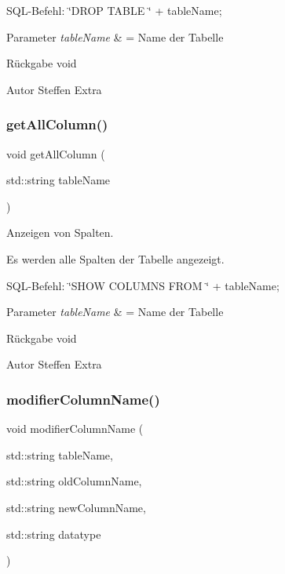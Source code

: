 S\+Q\+L-\/\+Befehl\+: \char`\"{}\+D\+R\+O\+P T\+A\+B\+L\+E \char`\"{} + table\+Name;


\begin{DoxyParams}{Parameter}
{\em table\+Name} & = Name der Tabelle\\
\hline
\end{DoxyParams}
\begin{DoxyReturn}{Rückgabe}
void
\end{DoxyReturn}
\begin{DoxyAuthor}{Autor}
Steffen Extra 
\end{DoxyAuthor}
\mbox{\label{tables_8hpp_aceb780082d3f7392e485cac394d6c606}} 
\subsubsection{get\+All\+Column()}
{\footnotesize\ttfamily void get\+All\+Column (\begin{DoxyParamCaption}\item[{std\+::string}]{table\+Name }\end{DoxyParamCaption})}



Anzeigen von Spalten. 

Es werden alle Spalten der Tabelle angezeigt. ~\newline


S\+Q\+L-\/\+Befehl\+: \char`\"{}\+S\+H\+O\+W C\+O\+L\+U\+M\+N\+S F\+R\+O\+M \char`\"{} + table\+Name;


\begin{DoxyParams}{Parameter}
{\em table\+Name} & = Name der Tabelle\\
\hline
\end{DoxyParams}
\begin{DoxyReturn}{Rückgabe}
void
\end{DoxyReturn}
\begin{DoxyAuthor}{Autor}
Steffen Extra 
\end{DoxyAuthor}
\mbox{\label{tables_8hpp_a244b10b3b373f8a174943176101a480f}} 
\subsubsection{modifier\+Column\+Name()}
{\footnotesize\ttfamily void modifier\+Column\+Name (\begin{DoxyParamCaption}\item[{std\+::string}]{table\+Name,  }\item[{std\+::string}]{old\+Column\+Name,  }\item[{std\+::string}]{new\+Column\+Name,  }\item[{std\+::string}]{datatype }\end{DoxyParamCaption})}



